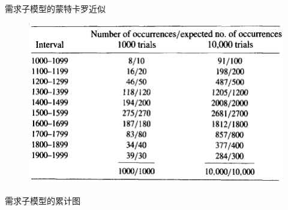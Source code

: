 \documentclass[mathserif, table]{beamer}
\begin{document}
\begin{frame}{需求子模型的蒙特卡罗近似}
  \begin{figure}
    \includegraphics[width=.7\textwidth{}]{gas-mtkl.png}
  \end{figure}  
\end{frame}

\begin{frame}{需求子模型的累计图}
  \begin{figure}
    \setcounter{subfigure}{0}{}
  \end{figure}
\end{frame}
\end{document}
